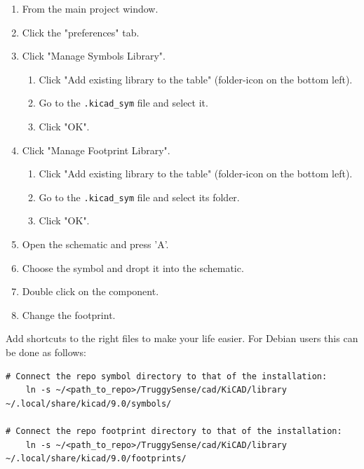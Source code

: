 \documentclass[ti,oneside,10pt]{uantwerpenreport}
\begin{document}
\begin{enumerate}[label*=\arabic*., nosep]
    \item From the main project window.
    \item Click the "preferences" tab.
    \item Click "Manage Symbols Library".
    \begin{enumerate}[label*=\arabic*., nosep]
        \item Click "Add existing library to the table" (folder-icon on the bottom left).
        \item Go to the \verb|.kicad_sym| file and select it.
        \item Click "OK".
    \end{enumerate}
    \item Click "Manage Footprint Library".
    \begin{enumerate}[label*=\arabic*., nosep]
        \item Click "Add existing library to the table" (folder-icon on the bottom left).
        \item Go to the \verb|.kicad_sym| file and select its folder.
        \item Click "OK".
    \end{enumerate}
    \item Open the schematic and press 'A'.
    \item Choose the symbol and dropt it into the schematic.
    \item Double click on the component.
    \item Change the footprint.
\end{enumerate}

Add shortcuts to the right files to make your life easier.
For Debian users this can be done as follows:
\begin{lstlisting}[style=cmd]
# Connect the repo symbol directory to that of the installation:
    ln -s ~/<path_to_repo>/TruggySense/cad/KiCAD/library ~/.local/share/kicad/9.0/symbols/

# Connect the repo footprint directory to that of the installation:
    ln -s ~/<path_to_repo>/TruggySense/cad/KiCAD/library ~/.local/share/kicad/9.0/footprints/
\end{lstlisting}
\end{document}
